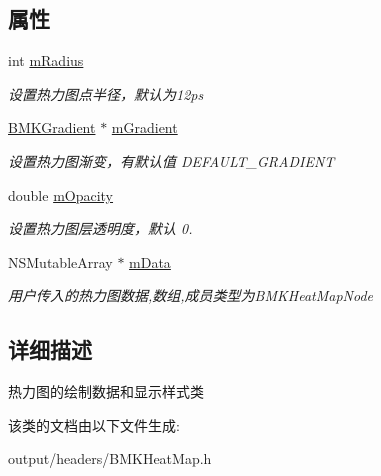 \subsection*{属性}
\begin{DoxyCompactItemize}
\item 
\hypertarget{interface_b_m_k_heat_map_a3e1a824fe5eb272797ac9b39cc596519}{}int \hyperlink{interface_b_m_k_heat_map_a3e1a824fe5eb272797ac9b39cc596519}{m\+Radius}\label{interface_b_m_k_heat_map_a3e1a824fe5eb272797ac9b39cc596519}

\begin{DoxyCompactList}\small\item\em 设置热力图点半径，默认为12ps \end{DoxyCompactList}\item 
\hypertarget{interface_b_m_k_heat_map_a2457a3c31731e42bfba4d17e4c83801f}{}\hyperlink{interface_b_m_k_gradient}{B\+M\+K\+Gradient} $\ast$ \hyperlink{interface_b_m_k_heat_map_a2457a3c31731e42bfba4d17e4c83801f}{m\+Gradient}\label{interface_b_m_k_heat_map_a2457a3c31731e42bfba4d17e4c83801f}

\begin{DoxyCompactList}\small\item\em 设置热力图渐变，有默认值 D\+E\+F\+A\+U\+L\+T\+\_\+\+G\+R\+A\+D\+I\+E\+N\+T \end{DoxyCompactList}\item 
\hypertarget{interface_b_m_k_heat_map_aa012e076b6487c0670499f61e8fe807f}{}double \hyperlink{interface_b_m_k_heat_map_aa012e076b6487c0670499f61e8fe807f}{m\+Opacity}\label{interface_b_m_k_heat_map_aa012e076b6487c0670499f61e8fe807f}

\begin{DoxyCompactList}\small\item\em 设置热力图层透明度，默认 0. \end{DoxyCompactList}\item 
\hypertarget{interface_b_m_k_heat_map_aa433ebe06960ff584026d8d2d191a6fe}{}N\+S\+Mutable\+Array $\ast$ \hyperlink{interface_b_m_k_heat_map_aa433ebe06960ff584026d8d2d191a6fe}{m\+Data}\label{interface_b_m_k_heat_map_aa433ebe06960ff584026d8d2d191a6fe}

\begin{DoxyCompactList}\small\item\em 用户传入的热力图数据,数组,成员类型为\+B\+M\+K\+Heat\+Map\+Node \end{DoxyCompactList}\end{DoxyCompactItemize}


\subsection{详细描述}
热力图的绘制数据和显示样式类 

该类的文档由以下文件生成\+:\begin{DoxyCompactItemize}
\item 
output/headers/B\+M\+K\+Heat\+Map.\+h\end{DoxyCompactItemize}
